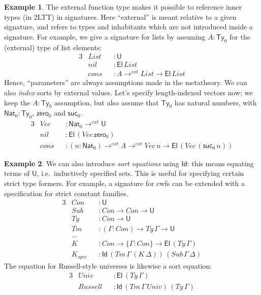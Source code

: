 \documentclass[12pt,a4paper,twoside,openany]{book}
\theoremstyle{remark}
\theoremstyle{definition}
\newtheorem{myexample}{Example}
\theoremstyle{theorem}
\newcommand{\mi}[1]{\mathit{#1}}
\newcommand{\ms}[1]{\mathsf{#1}}
\newcommand{\zero}{\ms{zero}}
\newcommand{\suc}{\ms{suc}}
\newcommand{\Ty}{\mathsf{Ty}}
\newcommand{\U}{\mathsf{U}}
\newcommand{\El}{\mathsf{El}}
\newcommand{\Id}{\mathsf{Id}}
\newcommand{\Nat}{\ms{Nat}}
\begin{document}
\begin{myexample}
The external function type makes it possible to reference inner types (in 2LTT)
in signatures. Here ``external'' is meant relative to a given signature, and
refers to types and inhabitants which are not introduced inside a signature.
For example, we give a signature for lists by assuming $A : \Ty_0$ for the
(external) type of list elements:
\begin{alignat*}{3}
  &\mi{List} &&: \U\\
  &\mi{nil}  &&: \El\,\mi{List}\\
  &\mi{cons} &&: A \to^{ext} \mi{List} \to \El\,\mi{List}
\end{alignat*}
Hence, ``parameters'' are always assumptions made in the metatheory. We can
also \emph{index} sorts by external values. Let's specify length-indexed vectors
now; we keep the $A : \Ty_0$ assumption, but also assume that $\Ty_0$ has
natural numbers, with $\Nat_0 : \Ty_0$, $\zero_0$ and $\suc_0$.
\begin{alignat*}{3}
  &\mi{Vec}  &&: \Nat_0 \to^{ext} \U \\
  &\mi{nil}  &&: \El\,(\mi{Vec}\,\zero_0)\\
  &\mi{cons} &&: (n : \Nat_0) \to^{ext} A \to^{ext} \mi{Vec}\,n \to \El\,(\mi{Vec}\,(\suc_0\,n))
\end{alignat*}
\end{myexample}

\begin{myexample}
We can also introduce \emph{sort equations} using $\Id$: this means equating
terms of $\U$, i.e.\ inductively specified sets. This is useful for specifying
certain strict type formers. For example, a signature for cwfs can be extended with
a specification for strict constant families.
\begin{alignat*}{3}
  & \mi{Con}     &&: \U\\
  & \mi{Sub}     &&: \mi{Con} \to \mi{Con} \to \U \\
  & \mi{Ty}      &&: \mi{Con} \to \U\\
  & \mi{Tm}      &&: (\Gamma : \mi{Con}) \to \mi{Ty}\,\Gamma \to \U\\
  & ...          &&\\
  & \mi{K}       &&: \mi{Con} \to \{\Gamma : \mi{Con}\} \to \El\,(\mi{Ty}\,\Gamma)\\
  & \mi{K_{spec}} &&: \Id\,(\mi{Tm}\,\Gamma\,(\mi{K}\,\Delta))\,(\mi{Sub}\,\Gamma\,\Delta)
\end{alignat*}
The equation for Russell-style universes is likewise a sort equation:
\begin{alignat*}{3}
  &\mi{Univ}    &&: \El\,(\mi{Ty}\,\Gamma)\\
  &\mi{Russell} &&: \Id\,(\mi{Tm}\,\Gamma\,\mi{Univ})\,(\mi{Ty}\,\Gamma)
\end{alignat*}
\end{myexample}
\end{document}

